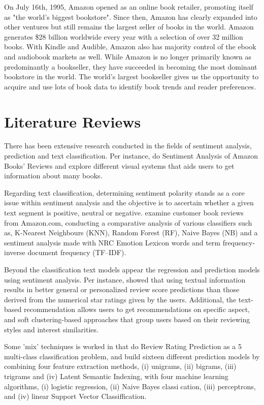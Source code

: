 \documentclass[12pt]{article}
\numberwithin{equation}{section}
\begin{document}
On July 16th, 1995, Amazon opened as an online book retailer, promoting itself as "the world's biggest bookstore". Since then, Amazon has clearly expanded into other ventures but still remains the largest seller of books in the world. Amazon generates \$28 billion worldwide every year with a selection of over 32 million books. With Kindle and Audible, Amazon also has majority control of the ebook and audiobook markets as well. While Amazon is no longer primarily known as predominantly a bookseller, they have succeeded in becoming the most dominant bookstore in the world. The world's largest bookseller gives us the opportunity to acquire and use lots of book data to identify book trends and reader preferences.

\section{Literature Reviews}
There has been extensive research conducted in the fields of sentiment analysis, prediction and text classification. Per instance, \textcite{Almjawel} do Sentiment Analysis of  Amazon Books' Reviews and explore different visual systems that aids users to get information about many books. 

Regarding text classification, determining sentiment polarity stands as a core issue within sentiment analysis and the objective is to ascertain whether a given text segment is positive, neutral or negative. \textcite{Srujan} examine customer book reviews from Amazon.com, conducting a comparative analysis of various classifiers such as, K-Nearest Neighbours (KNN), Random Forest (RF), Naive Bayes (NB) and a sentiment analysis made with NRC Emotion Lexicon words and term frequency-inverse document frequency (TF–IDF).

Beyond the classification text models appear the regression and prediction models using sentiment analysis. Per instance, \textcite{Ganu} showed that using textual information results in better general or personalized review score predictions than those derived from the numerical star ratings given by the users. Additional, the text-based recommendation allows users to get recommendations on specific aspect, and soft clustering-based approaches that group users based on their reviewing styles and interest similarities.

Some 'mix' techniques is worked in \textcite{Asghar} that do Review Rating Prediction as a 5 multi-class classification problem, and build sixteen different prediction models by combining four feature extraction methods, (i) unigrams, (ii) bigrams, (iii) trigrams and (iv) Latent Semantic Indexing, with four machine learning algorithms, (i) logistic regression, (ii) Naive Bayes classication, (iii) perceptrons, and (iv) linear Support Vector Classiffication.
\end{document}
